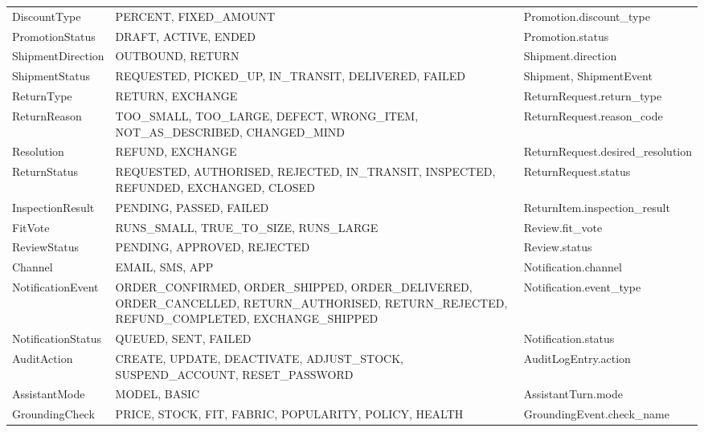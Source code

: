 {\begin{xltabular}{\textwidth}{@{}L{3.2cm} Y L{3.4cm}@{}}
DiscountType & PERCENT, FIXED\_AMOUNT & Promotion.\allowbreak discount\_type \\
PromotionStatus & DRAFT, ACTIVE, ENDED & Promotion.\allowbreak status \\
ShipmentDirection & OUTBOUND, RETURN & Shipment.\allowbreak direction \\
ShipmentStatus & REQUESTED, PICKED\_UP, IN\_TRANSIT, DELIVERED, FAILED & Shipment, ShipmentEvent \\
ReturnType & RETURN, EXCHANGE & ReturnRequest.\allowbreak return\_type \\
ReturnReason & TOO\_SMALL, TOO\_LARGE, DEFECT, WRONG\_ITEM, NOT\_AS\_DESCRIBED, CHANGED\_MIND & ReturnRequest.\allowbreak reason\_code \\
Resolution & REFUND, EXCHANGE & ReturnRequest.\allowbreak desired\_resolution \\
ReturnStatus & REQUESTED, AUTHORISED, REJECTED, IN\_TRANSIT, INSPECTED, REFUNDED, EXCHANGED, CLOSED & ReturnRequest.\allowbreak status \\
InspectionResult & PENDING, PASSED, FAILED & ReturnItem.\allowbreak inspection\_result \\
FitVote & RUNS\_SMALL, TRUE\_TO\_SIZE, RUNS\_LARGE & Review.\allowbreak fit\_vote \\
ReviewStatus & PENDING, APPROVED, REJECTED & Review.\allowbreak status \\
Channel & EMAIL, SMS, APP & Notification.\allowbreak channel \\
NotificationEvent & ORDER\_CONFIRMED, ORDER\_SHIPPED, ORDER\_DELIVERED, ORDER\_CANCELLED, RETURN\_AUTHORISED, RETURN\_REJECTED, REFUND\_COMPLETED, EXCHANGE\_SHIPPED & Notification.\allowbreak event\_type \\
NotificationStatus & QUEUED, SENT, FAILED & Notification.\allowbreak status \\
AuditAction & CREATE, UPDATE, DEACTIVATE, ADJUST\_STOCK, SUSPEND\_ACCOUNT, RESET\_PASSWORD & AuditLogEntry.\allowbreak action \\
AssistantMode & MODEL, BASIC & AssistantTurn.\allowbreak mode \\
GroundingCheck & PRICE, STOCK, FIT, FABRIC, POPULARITY, POLICY, HEALTH & GroundingEvent.\allowbreak check\_name \\
\end{xltabular}
}

